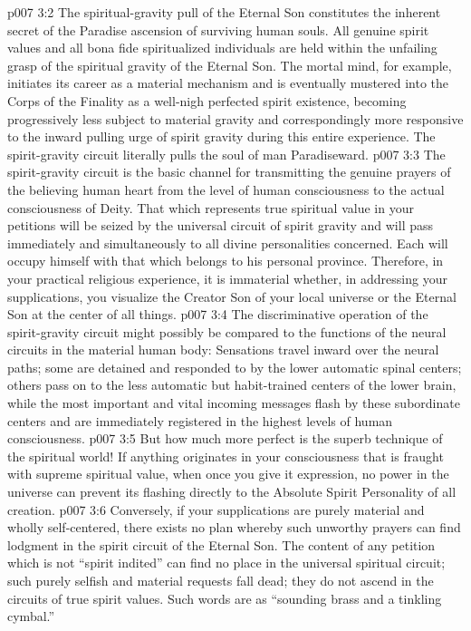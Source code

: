 \vs p007 3:2 The spiritual\hyp{}gravity pull of the Eternal Son constitutes the inherent secret of the Paradise ascension of surviving human souls. All genuine spirit values and all bona fide spiritualized individuals are held within the unfailing grasp of the spiritual gravity of the Eternal Son. The mortal mind, for example, initiates its career as a material mechanism and is eventually mustered into the Corps of the Finality as a well\hyp{}nigh perfected spirit existence, becoming progressively less subject to material gravity and correspondingly more responsive to the inward pulling urge of spirit gravity during this entire experience. The spirit\hyp{}gravity circuit literally pulls the soul of man Paradiseward.
\vs p007 3:3 \pc The spirit\hyp{}gravity circuit is the basic channel for transmitting the genuine prayers of the believing human heart from the level of human consciousness to the actual consciousness of Deity. That which represents true spiritual value in your petitions will be seized by the universal circuit of spirit gravity and will pass immediately and simultaneously to all divine personalities concerned. Each will occupy himself with that which belongs to his personal province. Therefore, in your practical religious experience, it is immaterial whether, in addressing your supplications, you visualize the Creator Son of your local universe or the Eternal Son at the center of all things.
\vs p007 3:4 \pc The discriminative operation of the spirit\hyp{}gravity circuit might possibly be compared to the functions of the neural circuits in the material human body: Sensations travel inward over the neural paths; some are detained and responded to by the lower automatic spinal centers; others pass on to the less automatic but habit\hyp{}trained centers of the lower brain, while the most important and vital incoming messages flash by these subordinate centers and are immediately registered in the highest levels of human consciousness.
\vs p007 3:5 But how much more perfect is the superb technique of the spiritual world! If anything originates in your consciousness that is fraught with supreme spiritual value, when once you give it expression, no power in the universe can prevent its flashing directly to the Absolute Spirit Personality of all creation.
\vs p007 3:6 Conversely, if your supplications are purely material and wholly self\hyp{}centered, there exists no plan whereby such unworthy prayers can find lodgment in the spirit circuit of the Eternal Son. The content of any petition which is not “spirit indited” can find no place in the universal spiritual circuit; such purely selfish and material requests fall dead; they do not ascend in the circuits of true spirit values. Such words are as “sounding brass and a tinkling cymbal.”
